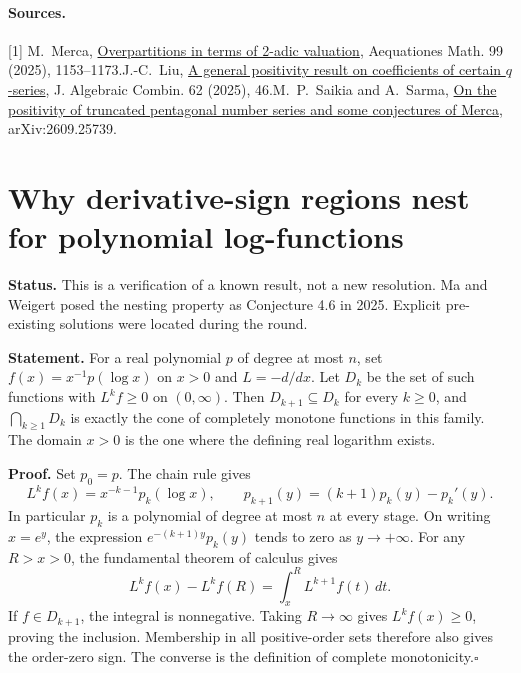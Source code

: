 \documentclass[11pt,a4paper]{article}
\numberwithin{equation}{section}
\theoremstyle{definition}
\theoremstyle{remark}
\begin{document}
\paragraph{Sources.}
[1] M.~Merca, \href{https://doi.org/10.1007/s00010-024-01117-6}{Overpartitions in terms of 2-adic valuation}, Aequationes Math. 99 (2025), 1153--1173.\quad
[2] J.-C.~Liu, \href{https://arxiv.org/abs/2409.19907}{A general positivity result on coefficients of certain $q$-series}, J. Algebraic Combin. 62 (2025), 46.\quad
[3] M.~P.~Saikia and A.~Sarma, \href{https://arxiv.org/abs/2609.25739}{On the positivity of truncated pentagonal number series and some conjectures of Merca}, arXiv:2609.25739.

\par\endgroup

\begingroup

\section{\texorpdfstring{Why derivative-sign regions nest for polynomial log-functions}{Why derivative-sign regions nest for polynomial log-functions}}\label{section:r26heisei}
\par\medskip


\textbf{Status.} This is a verification of a known result, not a new resolution.
Ma and Weigert posed the nesting property as Conjecture 4.6 in 2025.
Explicit pre-existing solutions were located during the round.

\textbf{Statement.} For a real polynomial $p$ of degree at most $n$, set
$f(x)=x^{-1}p(\log x)$ on $x>0$ and $L=-d/dx$. Let $D_k$ be the
set of such functions with $L^kf\ge0$ on $(0,\infty)$. Then
$D_{k+1}\subseteq D_k$ for every $k\ge0$, and
$\bigcap_{k\ge1}D_k$ is exactly the cone of completely monotone
functions in this family. The domain $x>0$ is the one where the defining real logarithm exists.

\textbf{Proof.} Set $p_0=p$. The chain rule gives
\[
 L^kf(x)=x^{-k-1}p_k(\log x),\qquad
 p_{k+1}(y)=(k+1)p_k(y)-p_k'(y).
\]
In particular $p_k$ is a polynomial of degree at most $n$ at every
stage. On writing $x=e^y$, the expression $e^{-(k+1)y}p_k(y)$ tends
to zero as $y\to+\infty$. For any $R>x>0$, the fundamental theorem of calculus gives
\[
 L^kf(x)-L^kf(R)=\int_x^R L^{k+1}f(t)\,dt.
\]
If $f\in D_{k+1}$, the integral is nonnegative. Taking $R\to\infty$
gives $L^kf(x)\ge0$, proving the inclusion. Membership in
all positive-order sets therefore also gives the order-zero sign.
The converse is the definition of complete monotonicity.\hfill$\square$
\end{document}
